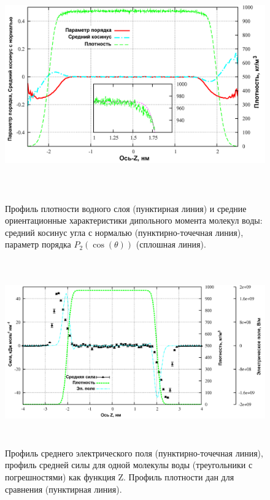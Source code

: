 \begin{figure}
\includegraphics[width=16cm,height=10cm]{orddens}
\caption{\label{orddens} Профиль плотности водного слоя (пунктирная линия) и средние ориентационные характеристики дипольного момента молекул воды: средний косинус угла с нормалью (пунктирно-точечная линия),  параметр порядка $P_2(\cos(\theta))$ (сплошная линия). }
\end{figure}

\begin{figure}
\includegraphics[width=16cm,height=8cm]{mf_d_field}
\caption{\label{mf_d_field}Профиль среднего электрического поля (пунктирно-точечная линия), профиль средней силы для одной молекулы воды (треугольники с погрешностями) как функция Z. Профиль плотности дан для сравнения (пунктирная линия).}
\end{figure}

